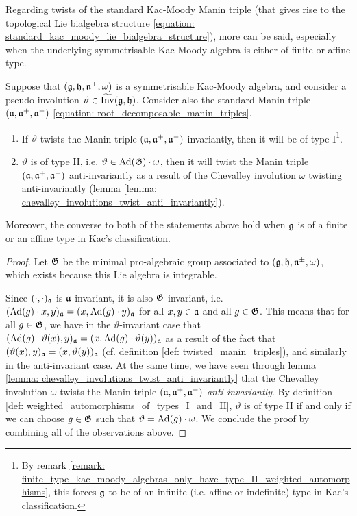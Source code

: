         Regarding twists of the standard Kac-Moody Manin triple (that gives rise to the topological Lie bialgebra structure \eqref{equation: standard_kac_moody_lie_bialgebra_structure}), more can be said, especially when the underlying symmetrisable Kac-Moody algebra is either of finite or affine type.
        \begin{theorem} \label{theorem: twisted_forms_and_coideal_subalgebras_of_kac_moody_lie_bialgebras}
            Suppose that $(\mathfrak{g}, \mathfrak{h}, \mathfrak{n}^{\pm}, \omega)$ is a symmetrisable Kac-Moody algebra, and consider a pseudo-involution $\vartheta \in \widetilde{\operatorname{Inv}}(\mathfrak{g}, \mathfrak{h})$. Consider also the standard Manin triple $(\mathfrak{a}, \mathfrak{a}^+, \mathfrak{a}^-)$ \eqref{equation: root_decomposable_manin_triples}.
            \begin{enumerate}
                \item If $\vartheta$ twists the Manin triple $(\mathfrak{a}, \mathfrak{a}^+, \mathfrak{a}^-)$ invariantly, then it will be of type I\footnote{By remark \ref{remark: finite_type_kac_moody_algebras_only_have_type_II_weighted_automorphisms}, this forces $\mathfrak{g}$ to be of an infinite (i.e. affine or indefinite) type in Kac's classification.}.
                \item $\vartheta$ is of type II, i.e. $\vartheta \in \mathrm{Ad}(\mathfrak{G}) \cdot \omega$, then it will twist the Manin triple $(\mathfrak{a}, \mathfrak{a}^+, \mathfrak{a}^-)$ anti-invariantly as a result of the Chevalley involution $\omega$ twisting anti-invariantly (lemma \ref{lemma: chevalley_involutions_twist_anti_invariantly}).
            \end{enumerate}
            Moreover, the converse to both of the statements above hold when $\mathfrak{g}$ is of a finite or an affine type in Kac's classification.
        \end{theorem}
            \begin{proof}
                Let $\mathfrak{G}$ be the minimal pro-algebraic group associated to $(\mathfrak{g}, \mathfrak{h}, \mathfrak{n}^{\pm}, \omega)$, which exists because this Lie algebra is integrable.
                
                Since $(\cdot, \cdot)_{\mathfrak{a}}$ is $\mathfrak{a}$-invariant, it is also $\mathfrak{G}$-invariant, i.e. $(\mathrm{Ad}(g) \cdot x, y)_{\mathfrak{a}} = (x, \mathrm{Ad}(g) \cdot y)_{\mathfrak{a}}$ for all $x, y \in \mathfrak{a}$ and all $g \in \mathfrak{G}$. This means that for all $g \in \mathfrak{G}$, we have in the $\vartheta$-invariant case that $( \mathrm{Ad}(g) \cdot \vartheta(x), y )_{\mathfrak{a}} = ( x, \mathrm{Ad}(g) \cdot \vartheta(y) )_{\mathfrak{a}}$ as a result of the fact that $( \vartheta(x), y )_{\mathfrak{a}} = ( x, \vartheta(y) )_{\mathfrak{a}}$ (cf. definition \ref{def: twisted_manin_triples}), and similarly in the anti-invariant case. At the same time, we have seen through lemma \ref{lemma: chevalley_involutions_twist_anti_invariantly} that the Chevalley involution $\omega$ twists the Manin triple $(\mathfrak{a}, \mathfrak{a}^+, \mathfrak{a}^-)$ \textit{anti-invariantly}. By definition \ref{def: weighted_automorphisms_of_types_I_and_II}, $\vartheta$ is of type II if and only if we can choose $g \in \mathfrak{G}$ such that $\vartheta = \mathrm{Ad}(g) \cdot \omega$. We conclude the proof by combining all of the observations above.
            \end{proof}
